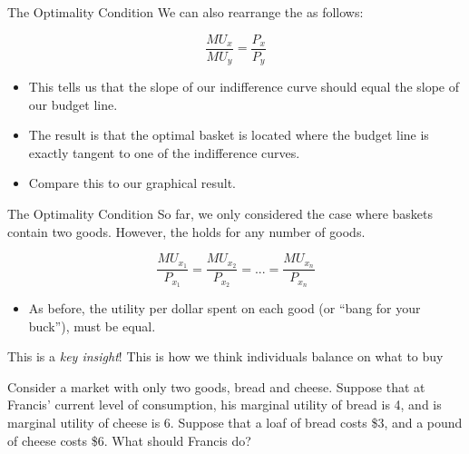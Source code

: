 \documentclass[12pt,t]{beamer}
\begin{document}
\begin{frame}{The Optimality Condition}
  We can also rearrange the  as follows:

  $$
    \frac{MU_x}{MU_y} = \frac{P_x}{P_y}
  $$

  \bigskip
  \begin{itemize}
    \item This tells us that the slope of our indifference curve should equal the slope of our budget line.
    \pause
    \item The result is that the optimal basket is located where the budget line is exactly tangent to one of the indifference curves.
    \item Compare this to our graphical result.
  \end{itemize}
\end{frame}

\begin{frame}{The Optimality Condition}
  So far, we only considered the case where baskets contain two goods. However, the  holds for any number of goods.

  $$
    \frac{MU_{x_1}}{P_{x_1}}=\frac{MU_{x_2}}{P_{x_2}}=...=\frac{MU_{x_n}}{P_{x_n}}
  $$

  \begin{itemize}
    \item As before, the utility per dollar spent on each good (or ``bang for your buck''), must be equal.
  \end{itemize}

  \pause\bigskip
  \begin{center}
    This is a \emph {key insight}! This  is how we think individuals balance  on what to buy
  \end{center}
\end{frame}

\begin{frame}

  \bigskip
  Consider a market with only two goods, bread and cheese. Suppose that at Francis' current level of consumption, his marginal utility of bread is 4, and is marginal utility of cheese is 6. Suppose that a loaf of bread costs \$3, and a pound of cheese costs \$6. What should Francis do?

\end{frame}
\end{document}
